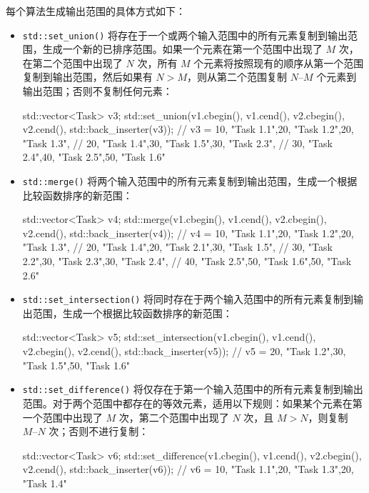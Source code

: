每个算法生成输出范围的具体方式如下：

\begin{itemize}
\item
\verb|std::set_union()| 将存在于一个或两个输入范围中的所有元素复制到输出范围，生成一个新的已排序范围。如果一个元素在第一个范围中出现了 $M$ 次，在第二个范围中出现了 $N$ 次，所有 $M$ 个元素将按照现有的顺序从第一个范围复制到输出范围，然后如果有 $N > M$，则从第二个范围复制 $N – M$ 个元素到输出范围；否则不复制任何元素：

\begin{cpp}
std::vector<Task> v3;
std::set_union(v1.cbegin(), v1.cend(),
v2.cbegin(), v2.cend(),
std::back_inserter(v3));
// v3 = {{10, "Task 1.1"},{20, "Task 1.2"},{20, "Task 1.3"},
//       {20, "Task 1.4"},{30, "Task 1.5"},{30, "Task 2.3"},
//       {30, "Task 2.4"},{40, "Task 2.5"},{50, "Task 1.6"}}
\end{cpp}

\item
\verb|std::merge()| 将两个输入范围中的所有元素复制到输出范围，生成一个根据比较函数排序的新范围：

\begin{cpp}
std::vector<Task> v4;
std::merge(v1.cbegin(), v1.cend(),
           v2.cbegin(), v2.cend(),
           std::back_inserter(v4));
// v4 = {{10, "Task 1.1"},{20, "Task 1.2"},{20, "Task 1.3"},
//       {20, "Task 1.4"},{20, "Task 2.1"},{30, "Task 1.5"},
//       {30, "Task 2.2"},{30, "Task 2.3"},{30, "Task 2.4"},
//       {40, "Task 2.5"},{50, "Task 1.6"},{50, "Task 2.6"}}
\end{cpp}

\item
\verb|std::set_intersection()| 将同时存在于两个输入范围中的所有元素复制到输出范围，生成一个根据比较函数排序的新范围：

\begin{cpp}
std::vector<Task> v5;
std::set_intersection(v1.cbegin(), v1.cend(),
                      v2.cbegin(), v2.cend(),
                      std::back_inserter(v5));
// v5 = {{20, "Task 1.2"},{30, "Task 1.5"},{50, "Task 1.6"}}
\end{cpp}

\item
\verb|std::set_difference()| 将仅存在于第一个输入范围中的所有元素复制到输出范围。对于两个范围中都存在的等效元素，适用以下规则：如果某个元素在第一个范围中出现了 $M$ 次，第二个范围中出现了 $N$ 次，且 $M > N$，则复制 $M – N$ 次；否则不进行复制：

\begin{cpp}
std::vector<Task> v6;
std::set_difference(v1.cbegin(), v1.cend(),
                    v2.cbegin(), v2.cend(),
                    std::back_inserter(v6));
// v6 = {{10, "Task 1.1"},{20, "Task 1.3"},{20, "Task 1.4"}}
\end{cpp}


\end{itemize}

